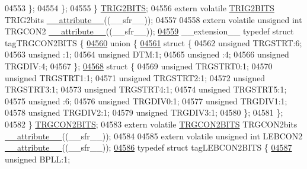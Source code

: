 \begin{DoxyCode}
04553     \};
04554   \};
04555 \} \hyperlink{a00014_d6/da7/a00822}{TRIG2BITS};
04556 \textcolor{keyword}{extern} \textcolor{keyword}{volatile} \hyperlink{a00014_d6/da7/a00822}{TRIG2BITS} TRIG2bits \hyperlink{a00015_a493c46f03454991ccc5aa7a6e1dfb2a7}{\_\_attribute\_\_}((\_\_sfr\_\_));
04557 
04558 \textcolor{keyword}{extern} \textcolor{keyword}{volatile} \textcolor{keywordtype}{unsigned} \textcolor{keywordtype}{int}  TRGCON2 \hyperlink{a00015_a493c46f03454991ccc5aa7a6e1dfb2a7}{\_\_attribute\_\_}((\_\_sfr\_\_));
\hypertarget{a00015_source_l04559}{}\hyperlink{a00014}{04559} \_\_extension\_\_ \textcolor{keyword}{typedef} \textcolor{keyword}{struct }tagTRGCON2BITS \{
\hypertarget{a00015_source_l04560}{}\hyperlink{a00015}{04560}   \textcolor{keyword}{union }\{
\hypertarget{a00015_source_l04561}{}\hyperlink{a00015}{04561}     \textcolor{keyword}{struct }\{
04562       \textcolor{keywordtype}{unsigned} TRGSTRT:6;
04563       \textcolor{keywordtype}{unsigned} :1;
04564       \textcolor{keywordtype}{unsigned} DTM:1;
04565       \textcolor{keywordtype}{unsigned} :4;
04566       \textcolor{keywordtype}{unsigned} TRGDIV:4;
04567     \};
\hypertarget{a00015_source_l04568}{}\hyperlink{a00015}{04568}     \textcolor{keyword}{struct }\{
04569       \textcolor{keywordtype}{unsigned} TRGSTRT0:1;
04570       \textcolor{keywordtype}{unsigned} TRGSTRT1:1;
04571       \textcolor{keywordtype}{unsigned} TRGSTRT2:1;
04572       \textcolor{keywordtype}{unsigned} TRGSTRT3:1;
04573       \textcolor{keywordtype}{unsigned} TRGSTRT4:1;
04574       \textcolor{keywordtype}{unsigned} TRGSTRT5:1;
04575       \textcolor{keywordtype}{unsigned} :6;
04576       \textcolor{keywordtype}{unsigned} TRGDIV0:1;
04577       \textcolor{keywordtype}{unsigned} TRGDIV1:1;
04578       \textcolor{keywordtype}{unsigned} TRGDIV2:1;
04579       \textcolor{keywordtype}{unsigned} TRGDIV3:1;
04580     \};
04581   \};
04582 \} \hyperlink{a00014_de/d9d/a00813}{TRGCON2BITS};
04583 \textcolor{keyword}{extern} \textcolor{keyword}{volatile} \hyperlink{a00014_de/d9d/a00813}{TRGCON2BITS} TRGCON2bits \hyperlink{a00015_a493c46f03454991ccc5aa7a6e1dfb2a7}{\_\_attribute\_\_}((\_\_sfr\_\_));
04584 
04585 \textcolor{keyword}{extern} \textcolor{keyword}{volatile} \textcolor{keywordtype}{unsigned} \textcolor{keywordtype}{int}  LEBCON2 \hyperlink{a00015_a493c46f03454991ccc5aa7a6e1dfb2a7}{\_\_attribute\_\_}((\_\_sfr\_\_));
\hypertarget{a00015_source_l04586}{}\hyperlink{a00014}{04586} \textcolor{keyword}{typedef} \textcolor{keyword}{struct }tagLEBCON2BITS \{
\hypertarget{a00015_source_l04587}{}\hyperlink{a00014_a734b807d032fa494468c04783b84279d}{04587}   \textcolor{keywordtype}{unsigned} BPLL:1;

\end{DoxyCode}
